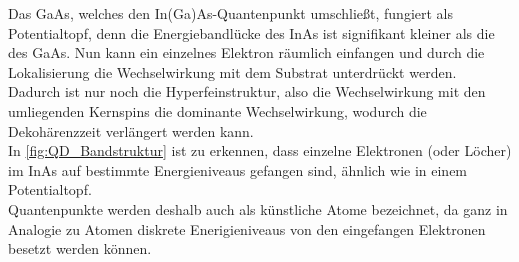 \noindent Das GaAs, welches den In(Ga)As-Quantenpunkt umschließt, fungiert als Potentialtopf, denn die Energiebandlücke des InAs ist 
signifikant kleiner als die des GaAs. Nun kann ein einzelnes Elektron räumlich einfangen und durch die Lokalisierung 
die Wechselwirkung mit dem Substrat unterdrückt werden. Dadurch ist nur noch die Hyperfeinstruktur, also die Wechselwirkung mit den 
umliegenden Kernspins die dominante Wechselwirkung, wodurch die Dekohärenzzeit verlängert werden kann.\\
In \autoref{fig:QD_Bandstruktur} ist zu erkennen, dass einzelne Elektronen (oder Löcher)
im InAs auf bestimmte Energieniveaus gefangen sind, ähnlich wie in einem Potentialtopf.\\
Quantenpunkte werden deshalb auch als \glqq künstliche Atome\grqq{} bezeichnet, da ganz in Analogie zu Atomen diskrete Enerigieniveaus 
von den eingefangen Elektronen besetzt werden können.
%